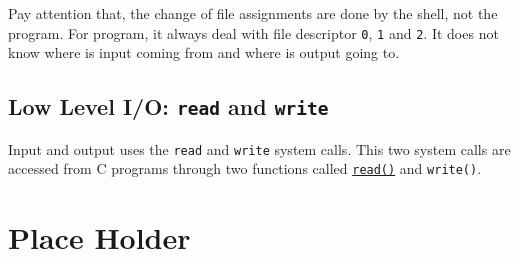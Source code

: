 \documentclass[12pt]{article}
\begin{document}
Pay attention that, the change of file assignments are done by the shell, not the program. For program, it always deal with file descriptor \texttt{0}, \texttt{1} and \texttt{2}. It does not know where is input coming from and where is output going to.
\subsection{Low Level I/O: \texttt{read} and \texttt{write}}
\label{sec:org3cee3cd}
Input and output uses the \texttt{read} and \texttt{write} system calls. This two system calls are accessed from C programs through two functions called \href{http://man7.org/linux/man-pages/man2/read.2.html}{\texttt{read()}} and \texttt{write()}.
\section{Place Holder}
\label{sec:orge582685}
\end{document}

